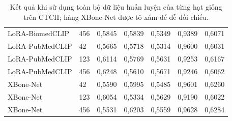 \begin{table}[H]
{\begin{tabular}{L{2.85cm}C{1.05cm}*{5}{C{1.55cm}}}
LoRA-BiomedCLIP & 456 & 0{,}5845 & 0{,}5839 & 0{,}5349 & 0{,}9389 & 0{,}6071 \\
LoRA-PubMedCLIP & 42 & 0{,}5665 & 0{,}5718 & 0{,}5314 & 0{,}9600 & 0{,}6031 \\
LoRA-PubMedCLIP & 123 & 0{,}6114 & 0{,}5769 & 0{,}5631 & 0{,}9253 & 0{,}6167 \\
LoRA-PubMedCLIP & 456 & 0{,}6248 & 0{,}5610 & 0{,}5671 & 0{,}9246 & 0{,}6062 \\
XBone-Net & 42 & 0{,}5590 & 0{,}5995 & 0{,}5485 & 0{,}9601 & 0{,}6260 \\
XBone-Net & 123 & 0{,}6054 & 0{,}5334 & 0{,}5629 & 0{,}9190 & 0{,}6022 \\
XBone-Net & 456 & 0{,}5531 & 0{,}6203 & 0{,}5559 & 0{,}9628 & 0{,}6284 \\
\bottomrule
\end{tabular}%
}
\caption{Kết quả khi sử dụng toàn bộ dữ liệu huấn luyện của từng hạt giống trên CTCH; hàng XBone-Net được tô xám để dễ đối chiếu.}
\label{tab:appendix-full-shot-seeds-ctch}
\end{table}
